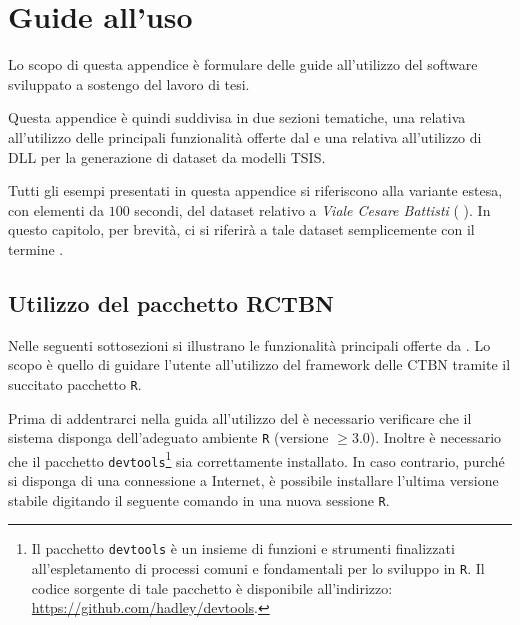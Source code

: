 
\chapter{Guide all'uso}
\label{cap:guide}
Lo scopo di questa appendice è formulare delle guide all'utilizzo del software sviluppato a sostengo del lavoro di tesi.

Questa appendice è quindi suddivisa in due sezioni tematiche, una relativa all'utilizzo delle principali funzionalità offerte dal \pacchettor{} e una relativa all'utilizzo di  \acs{DLL} per la generazione di dataset da modelli \acs{TSIS}.

Tutti gli esempi presentati in questa appendice si riferiscono alla variante estesa, con elementi da $100$ secondi, del dataset relativo a \emph{Viale Cesare Battisti} (\ie{} ). In questo capitolo, per brevità, ci si riferirà a tale dataset semplicemente con il termine .

\section{Utilizzo del pacchetto RCTBN}\label{sec:package-howto}
Nelle seguenti sottosezioni si illustrano le funzionalità principali offerte da \rctbn{}. Lo scopo è quello di guidare l'utente all'utilizzo del framework delle \acs{CTBN} tramite il succitato pacchetto \lstinline[]|R|.

Prima di addentrarci nella guida all'utilizzo del \pacchettor{} è necessario verificare che il sistema disponga dell'adeguato ambiente \lstinline[]|R| (versione $\ge 3.0$). Inoltre è necessario che il pacchetto \lstinline[]|devtools|\footnote{Il pacchetto \lstinline[]|devtools| è un insieme di funzioni e strumenti finalizzati all'espletamento di processi comuni e fondamentali per lo sviluppo in \lstinline[]|R|. Il codice sorgente di tale pacchetto è disponibile all'indirizzo: \url{https://github.com/hadley/devtools}.} sia correttamente installato. In caso contrario, purché si disponga di una connessione a Internet, è possibile installare l'ultima versione stabile digitando il seguente comando in una nuova sessione \lstinline[]|R|.

\vspace*{8pt}

